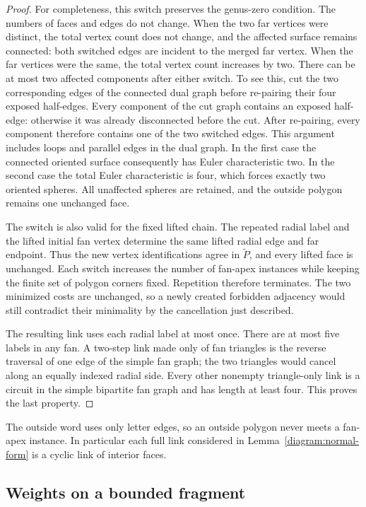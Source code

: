 \begin{proof}
For completeness, this switch preserves the genus-zero condition.
The numbers of faces and edges do not change.  When the two far
vertices were distinct, the total vertex count does not change, and
the affected surface remains connected: both switched edges are
incident to the merged far vertex.  When the far vertices were the
same, the total vertex count increases by two. There can be at most
two affected components after either switch. To see this, cut the two
corresponding edges of the connected dual graph before re-pairing
their four exposed half-edges. Every component of the cut graph
contains an exposed half-edge: otherwise it was already disconnected
before the cut. After re-pairing, every component therefore contains
one of the two switched edges. This argument includes loops and
parallel edges in the dual graph.
In the first case the connected oriented surface consequently has
Euler characteristic two.  In the second case the total Euler
characteristic is four, which forces exactly two oriented spheres.
All unaffected spheres are retained, and the outside polygon remains
one unchanged face.

The switch is also valid for the fixed lifted chain.  The repeated
radial label and the lifted initial fan vertex determine the same
lifted radial edge and far endpoint.  Thus the new vertex
identifications agree in $\widetilde P$, and every lifted face is
unchanged.  Each switch increases the number of fan-apex instances
while keeping the finite set of polygon corners fixed.  Repetition
therefore terminates.  The two minimized costs are unchanged, so a
newly created forbidden adjacency would still contradict their
minimality by the cancellation just described.

The resulting link uses each radial label at most once.  There are at
most five labels in any fan.  A two-step link made only of fan
triangles is the reverse traversal of one edge of the simple fan graph;
the two triangles would cancel along an equally indexed radial side.
Every other nonempty triangle-only link is a circuit in the simple
bipartite fan graph and has length at least four.  This proves the last
property.
\end{proof}

The outside word uses only letter edges, so an outside polygon never
meets a fan-apex instance.  In particular each full link considered in
Lemma~\ref{diagram:normal-form} is a cyclic link of interior faces.

\subsection{Weights on a bounded fragment}

